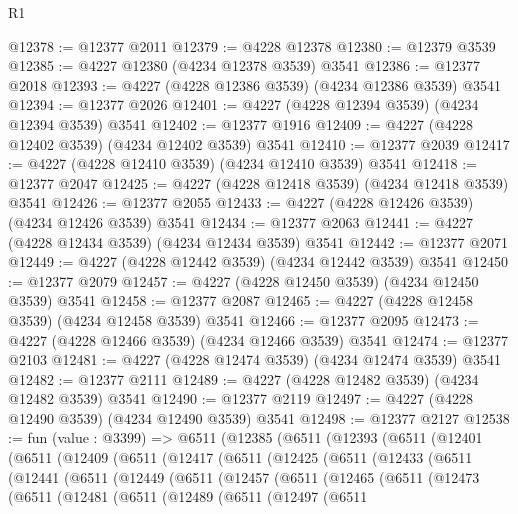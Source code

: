 \begin{lexlean}{R1}
\begin{coremodule}
@12378 := @12377 @2011
@12379 := @4228 @12378
@12380 := @12379 @3539
@12385 := @4227 @12380 (@4234 @12378 @3539) @3541
@12386 := @12377 @2018
@12393 := @4227 (@4228 @12386 @3539) (@4234 @12386 @3539) @3541
@12394 := @12377 @2026
@12401 := @4227 (@4228 @12394 @3539) (@4234 @12394 @3539) @3541
@12402 := @12377 @1916
@12409 := @4227 (@4228 @12402 @3539) (@4234 @12402 @3539) @3541
@12410 := @12377 @2039
@12417 := @4227 (@4228 @12410 @3539) (@4234 @12410 @3539) @3541
@12418 := @12377 @2047
@12425 := @4227 (@4228 @12418 @3539) (@4234 @12418 @3539) @3541
@12426 := @12377 @2055
@12433 := @4227 (@4228 @12426 @3539) (@4234 @12426 @3539) @3541
@12434 := @12377 @2063
@12441 := @4227 (@4228 @12434 @3539) (@4234 @12434 @3539) @3541
@12442 := @12377 @2071
@12449 := @4227 (@4228 @12442 @3539) (@4234 @12442 @3539) @3541
@12450 := @12377 @2079
@12457 := @4227 (@4228 @12450 @3539) (@4234 @12450 @3539) @3541
@12458 := @12377 @2087
@12465 := @4227 (@4228 @12458 @3539) (@4234 @12458 @3539) @3541
@12466 := @12377 @2095
@12473 := @4227 (@4228 @12466 @3539) (@4234 @12466 @3539) @3541
@12474 := @12377 @2103
@12481 := @4227 (@4228 @12474 @3539) (@4234 @12474 @3539) @3541
@12482 := @12377 @2111
@12489 := @4227 (@4228 @12482 @3539) (@4234 @12482 @3539) @3541
@12490 := @12377 @2119
@12497 := @4227 (@4228 @12490 @3539) (@4234 @12490 @3539) @3541
@12498 := @12377 @2127
@12538 := fun (value : @3399) =>
  @6511
    (@12385
      (@6511
        (@12393
          (@6511
            (@12401
              (@6511
                (@12409
                  (@6511
                    (@12417
                      (@6511
                        (@12425
                          (@6511
                            (@12433
                              (@6511
                                (@12441
                                  (@6511
                                    (@12449
                                      (@6511
                                        (@12457
                                          (@6511
                                            (@12465
                                              (@6511
                                                (@12473
                                                  (@6511
                                                    (@12481
                                                      (@6511
                                                        (@12489
                                                          (@6511
                                                            (@12497
                                                              (@6511

\end{coremodule}
\end{lexlean}
